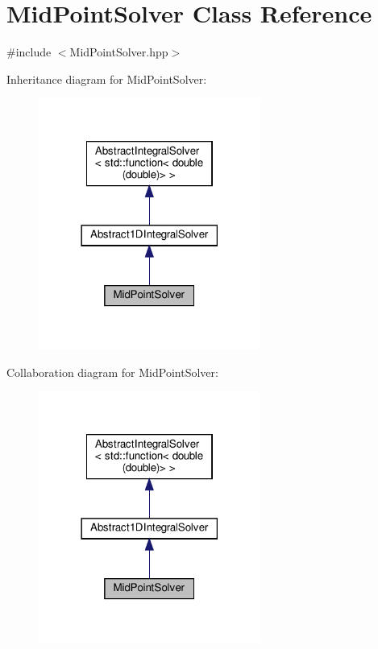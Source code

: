 \hypertarget{class_mid_point_solver}{}\section{Mid\+Point\+Solver Class Reference}
\label{class_mid_point_solver}


{\ttfamily \#include $<$Mid\+Point\+Solver.\+hpp$>$}



Inheritance diagram for Mid\+Point\+Solver\+:\nopagebreak
\begin{figure}[H]
\begin{center}
\leavevmode
\includegraphics[width=206pt]{class_mid_point_solver__inherit__graph}
\end{center}
\end{figure}


Collaboration diagram for Mid\+Point\+Solver\+:\nopagebreak
\begin{figure}[H]
\begin{center}
\leavevmode
\includegraphics[width=206pt]{class_mid_point_solver__coll__graph}
\end{center}
\end{figure}

